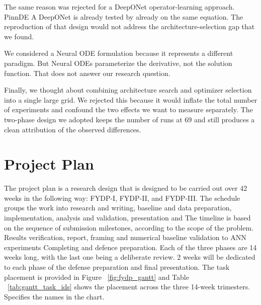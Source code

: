 The same reason was rejected for a DeepONet operator-learning approach. PinnDE
A DeepONet is already tested by already on the same equation. The reproduction of that design would not address the architecture-selection gap that we found.


We considered a Neural ODE formulation because it represents a different paradigm. But Neural ODEs parameterize the derivative, not the solution function. That does not answer our research question.

Finally, we thought about combining architecture search and optimizer selection into a single large grid. We rejected this because it would inflate the total number of experiments and confound the two effects we want to measure separately. The two-phase design we adopted keeps the number of runs at $69$ and still produces a clean attribution of the observed differences.

\section{Project Plan}

The project plan is a research design that is designed to be carried out over 42 weeks in the following way: FYDP-I, FYDP-II, and FYDP-III. The schedule groups the work into research and writing, baseline and data preparation, implementation, analysis and validation, presentation and The timeline is based on the sequence of submission milestones, according to the scope of the problem. Results verification, report, framing and numerical baseline validation to ANN experiments Completing and defence preparation. Each of the three phases are 14 weeks long, with the last one being a deliberate review. 2 weeks will be dedicated to each phase of the defense preparation and final presentation. The task placement is provided in Figure ~\ref{fig:fydp_gantt} and Table ~\ref{tab:gantt_task_ids} shows the placement across the three 14-week trimesters. Specifies the names in the chart.


